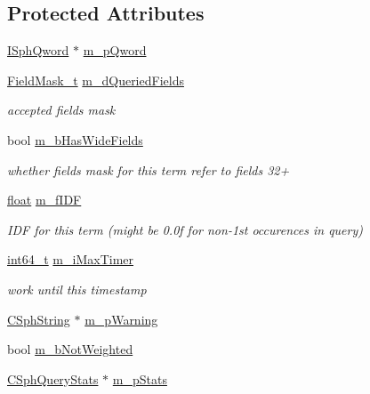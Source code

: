 \subsection*{Protected Attributes}
\begin{DoxyCompactItemize}
\item 
\hyperlink{classISphQword}{I\-Sph\-Qword} $\ast$ \hyperlink{classExtTerm__c_a89302676bbc0fddbb0b6d9a3955fbf75}{m\-\_\-p\-Qword}
\item 
\hyperlink{structFieldMask__t}{Field\-Mask\-\_\-t} \hyperlink{classExtTerm__c_a124e40beb7a432f1b9ed806bcc4317b5}{m\-\_\-d\-Queried\-Fields}
\begin{DoxyCompactList}\small\item\em accepted fields mask \end{DoxyCompactList}\item 
bool \hyperlink{classExtTerm__c_a0ff2909627ed1172e3d2dc56615c723b}{m\-\_\-b\-Has\-Wide\-Fields}
\begin{DoxyCompactList}\small\item\em whether fields mask for this term refer to fields 32+ \end{DoxyCompactList}\item 
\hyperlink{sphinxexpr_8cpp_a0e0d0739f7035f18f949c2db2c6759ec}{float} \hyperlink{classExtTerm__c_a61708a232afef18165f8696a03d92583}{m\-\_\-f\-I\-D\-F}
\begin{DoxyCompactList}\small\item\em I\-D\-F for this term (might be 0.\-0f for non-\/1st occurences in query) \end{DoxyCompactList}\item 
\hyperlink{sphinxstd_8h_a996e72f71b11a5bb8b3b7b6936b1516d}{int64\-\_\-t} \hyperlink{classExtTerm__c_ad1e0d11291cc5c27fe6a49c6f4a8e4a2}{m\-\_\-i\-Max\-Timer}
\begin{DoxyCompactList}\small\item\em work until this timestamp \end{DoxyCompactList}\item 
\hyperlink{structCSphString}{C\-Sph\-String} $\ast$ \hyperlink{classExtTerm__c_a92e4f5a49fbc463f242fe9e661c52bba}{m\-\_\-p\-Warning}
\item 
bool \hyperlink{classExtTerm__c_a353e10217afc66de607587ecc1571a54}{m\-\_\-b\-Not\-Weighted}
\item 
\hyperlink{structCSphQueryStats}{C\-Sph\-Query\-Stats} $\ast$ \hyperlink{classExtTerm__c_a3bedd3e85132436b50b5fd90113c5e3b}{m\-\_\-p\-Stats}
\item 

\end{DoxyCompactItemize}
